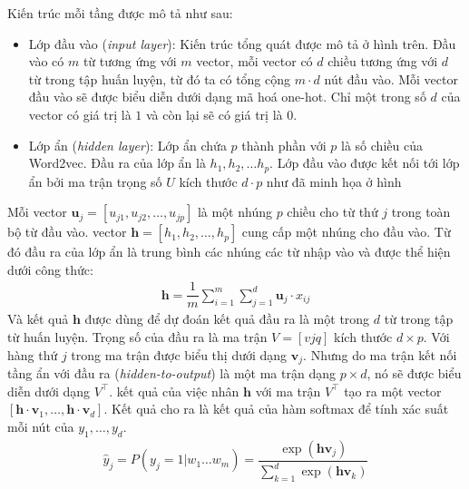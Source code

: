 Kiến trúc mỗi tầng được mô tả như sau: \cite{Aggarwal2022}
\begin{itemize}
    \item Lớp đầu vào (\textit{input layer}): Kiến trúc tổng quát được mô tả ở hình trên. Đầu vào có $m$ từ tương ứng với $m$ vector, mỗi vector có $d$ chiều tương ứng với $d$ từ trong tập huấn luyện, từ đó ta có tổng cộng $m\cdot d$ nút đầu vào. Mỗi vector đầu vào sẽ được biểu diễn dưới dạng mã hoá one-hot. Chỉ một trong số $d$ của vector có giá trị là $1$ và còn lại sẽ có giá trị là $0$.
    \item Lớp ẩn (\textit{hidden layer}): Lớp ẩn chứa $p$ thành phần với $p$ là số chiều của Word2vec. Đầu ra của lớp ẩn là  $h_1,h_2,\dots h_p$. Lớp đầu vào được kết nối tới lớp ẩn bởi ma trận trọng số $U$ kích thước $d\cdot p$ như đã minh họa ở hình %
\end{itemize}

Mỗi vector $\mathbf u_j = [u_{j1}, u_{j2},\dots,u_{jp}]$ là một nhúng $p$ chiều cho từ thứ $j$ trong toàn bộ từ đầu vào. vector $\mathbf h = [h_1,h_2,\dots,h_p]$ cung cấp một nhúng cho đầu vào. Từ đó đầu ra của lớp ẩn là trung bình các nhúng các từ nhập vào và được thể hiện dưới công thức:
\begin{align}
    \mathbf h=\dfrac{1}{m}\sum_{i=1}^m\sum_{j=1}^d\mathbf u_j\cdot x_{ij}
\end{align}
Và kết quả $\mathbf h$ được dùng để dự đoán kết quả đầu ra là một trong $d$ từ trong tập từ huấn luyện. Trọng số của đầu ra là ma trận $V = [v{jq}]$ kích thước $d\times p$. Với hàng thứ $j$ trong ma trận được biểu thị dưới dạng $\mathbf v_j$. Nhưng do ma trận kết nối tầng ẩn với đầu ra (\textit{hidden-to-output}) là một ma trận dạng $p\times d$, nó sẽ được biểu diễn dưới dạng $V^\intercal$. kết quả của việc nhân $\mathbf h$ với ma trận $V^\intercal$ tạo ra một vector $[\mathbf h\cdot\mathbf v_1,\dots,\mathbf h\cdot \mathbf v_d]$. Kết quả cho ra là kết quả của hàm softmax để tính xác suất mỗi nút của $y_1,\dots,y_d$.
\begin{align}
    \hat y_j=P(y_j=1|w_1\dots w_m)=\dfrac{\exp(\mathbf h\mathbf v_j)}{\sum_{k=1}^d\exp(\mathbf h\mathbf v_k)}
\end{align}

